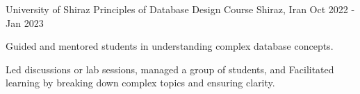

\begin{cventries}

  \cventry
    {University of Shiraz} %
    {Principles of Database Design Course} %
    {Shiraz, Iran} %
    {Oct 2022 - Jan 2023} %
    {
      \begin{cvitems} %
        \item {Guided and mentored students in understanding complex database concepts.}
        \item {Led discussions or lab sessions, managed a group of students, and Facilitated learning by breaking down complex topics and ensuring clarity.}
      \end{cvitems}
    }

\end{cventries}

